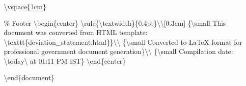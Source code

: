 \textbackslash{}vspace\{1cm\}

\% Footer
\textbackslash{}begin\{center\}
\textbackslash{}rule\{\textbackslash{}textwidth\}\{0.4pt\}\textbackslash{}\textbackslash{}[0.3cm]
\{\textbackslash{}small This document was converted from HTML template: \textbackslash{}texttt\{deviation\_statement.html\}\}\textbackslash{}\textbackslash{}
\{\textbackslash{}small Converted to LaTeX format for professional government document generation\}\textbackslash{}\textbackslash{}
\{\textbackslash{}small Compilation date: \textbackslash{}today\textbackslash{} at 01:11 PM IST\}
\textbackslash{}end\{center\}

\textbackslash{}end\{document\}